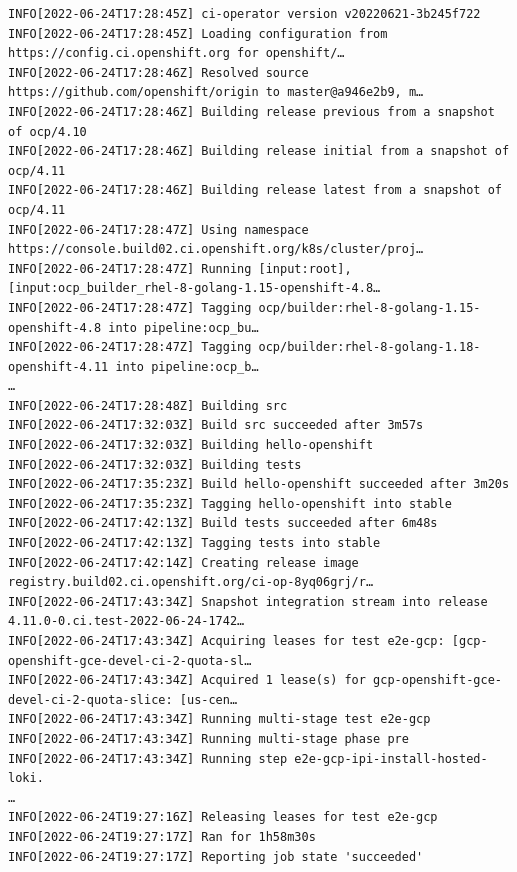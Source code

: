 \begin{frame}[fragile]
    \autotitle
    \tiny
    \begin{verbatim}
INFO[2022-06-24T17:28:45Z] ci-operator version v20220621-3b245f722
INFO[2022-06-24T17:28:45Z] Loading configuration from https://config.ci.openshift.org for openshift/…
INFO[2022-06-24T17:28:46Z] Resolved source https://github.com/openshift/origin to master@a946e2b9, m…
INFO[2022-06-24T17:28:46Z] Building release previous from a snapshot of ocp/4.10
INFO[2022-06-24T17:28:46Z] Building release initial from a snapshot of ocp/4.11
INFO[2022-06-24T17:28:46Z] Building release latest from a snapshot of ocp/4.11
INFO[2022-06-24T17:28:47Z] Using namespace https://console.build02.ci.openshift.org/k8s/cluster/proj…
INFO[2022-06-24T17:28:47Z] Running [input:root], [input:ocp_builder_rhel-8-golang-1.15-openshift-4.8…
INFO[2022-06-24T17:28:47Z] Tagging ocp/builder:rhel-8-golang-1.15-openshift-4.8 into pipeline:ocp_bu…
INFO[2022-06-24T17:28:47Z] Tagging ocp/builder:rhel-8-golang-1.18-openshift-4.11 into pipeline:ocp_b…
…
INFO[2022-06-24T17:28:48Z] Building src
INFO[2022-06-24T17:32:03Z] Build src succeeded after 3m57s
INFO[2022-06-24T17:32:03Z] Building hello-openshift
INFO[2022-06-24T17:32:03Z] Building tests
INFO[2022-06-24T17:35:23Z] Build hello-openshift succeeded after 3m20s
INFO[2022-06-24T17:35:23Z] Tagging hello-openshift into stable
INFO[2022-06-24T17:42:13Z] Build tests succeeded after 6m48s
INFO[2022-06-24T17:42:13Z] Tagging tests into stable
INFO[2022-06-24T17:42:14Z] Creating release image registry.build02.ci.openshift.org/ci-op-8yq06grj/r…
INFO[2022-06-24T17:43:34Z] Snapshot integration stream into release 4.11.0-0.ci.test-2022-06-24-1742…
INFO[2022-06-24T17:43:34Z] Acquiring leases for test e2e-gcp: [gcp-openshift-gce-devel-ci-2-quota-sl…
INFO[2022-06-24T17:43:34Z] Acquired 1 lease(s) for gcp-openshift-gce-devel-ci-2-quota-slice: [us-cen…
INFO[2022-06-24T17:43:34Z] Running multi-stage test e2e-gcp
INFO[2022-06-24T17:43:34Z] Running multi-stage phase pre
INFO[2022-06-24T17:43:34Z] Running step e2e-gcp-ipi-install-hosted-loki.
…
INFO[2022-06-24T19:27:16Z] Releasing leases for test e2e-gcp
INFO[2022-06-24T19:27:17Z] Ran for 1h58m30s
INFO[2022-06-24T19:27:17Z] Reporting job state 'succeeded'
    \end{verbatim}
\end{frame}

